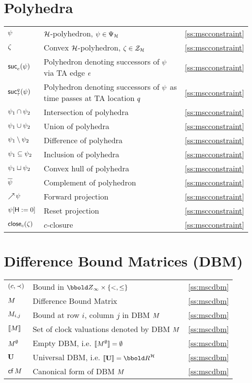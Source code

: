 {\section*{Polyhedra}
\begin{tabular}{l>{\raggedright}p{.4\linewidth}<{}l}
${\psi}$ & $\clocks$-polyhedron, $\clkcond \in \ClockConstraints$ & \ref{ss:mscconstraint} \\
${\zeta}$ & Convex $\clocks$-polyhedron, $\vexcond \in \ClockZones$ & \ref{ss:mscconstraint} \\ 
$\mathop{{\sf suc}_{e}^{}}({\psi})$ & Polyhedron denoting successors of
${\psi}$ via TA edge $e$ & \ref{ss:mscconstraint} \\
$\mathop{{\sf suc}_{\tau}^{q}}({\psi})$ & Polyhedron denoting successors of
${\psi}$ as time passes at TA location $q$ & \ref{ss:mscconstraint} \\
${\psi}_1 \cap {\psi}_2$ & Intersection of polyhedra & \ref{ss:mscconstraint} \\
${\psi}_1 \cup {\psi}_2$ & Union of polyhedra & \ref{ss:mscconstraint} \\
${\psi}_1 \setminus {\psi}_2$ & Difference of polyhedra & \ref{ss:mscconstraint} \\
${\psi}_1 \subseteq {\psi}_2$ & Inclusion of polyhedra & \ref{ss:mscconstraint} \\
${\psi}_1 \sqcup {\psi}_2$ & Convex hull of polyhedra & \ref{ss:mscconstraint} \\
$\overline{{\psi}}$ & Complement of polyhedron & \ref{ss:mscconstraint} \\
$\mathop{\nearrow}{{\psi}}$ & Forward projection  & \ref{ss:mscconstraint} \\
${\psi}[{\sf H} := 0]$ & Reset projection  & \ref{ss:mscconstraint} \\
${\mathop{{\sf close}_{c}}({\zeta})}$ & $c$-closure  & \ref{ss:mscconstraint} \\

\end{tabular}
\vfil

\section*{Difference Bound Matrices (DBM)}
\begin{tabular}{l>{\raggedright}p{.5\linewidth}<{}l}
$(c,\prec)$ & Bound in $\Zinf \cross \text{\mbox{$\{<, \leq\}$}}$ & \ref{ss:mscdbm} \\
${M}$ & Difference Bound Matrix & \ref{ss:mscdbm} \\
${M}_{i,j}$ & Bound at row $i$, column $j$ in DBM ${M}$ & \ref{ss:mscdbm} \\
${\lbrack\!\lbrack}{M}{\rbrack\!\rbrack}$ & Set of clock valuations denoted by DBM ${M}$ & \ref{ss:mscdbm} \\
${M}^\emptyset$ & Empty DBM, i.e. ${\lbrack\!\lbrack}{M}^\emptyset{\rbrack\!\rbrack} = \emptyset$ & \ref{ss:mscdbm} \\
$\mathbf{U}$ & Universal DBM, i.e. $\chset{\UU} = \clkvls$ & \ref{ss:mscdbm} \\
$\mathop{\sf cf}{{M}}$ & Canonical form of DBM ${M}$ & \ref{ss:mscdbm} \\
\end{tabular}
\vfil

}
